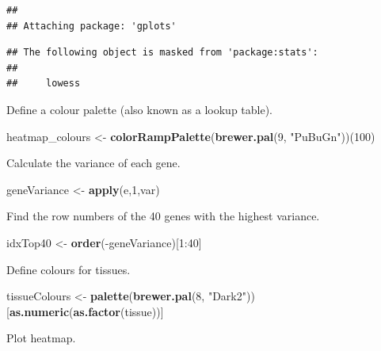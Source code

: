 \documentclass[]{book}
\newenvironment{Shaded}{\begin{snugshade}}{\end{snugshade}}
\newcommand{\KeywordTok}[1]{\textcolor[rgb]{0.13,0.29,0.53}{\textbf{{#1}}}}
\newcommand{\DecValTok}[1]{\textcolor[rgb]{0.00,0.00,0.81}{{#1}}}
\newcommand{\StringTok}[1]{\textcolor[rgb]{0.31,0.60,0.02}{{#1}}}
\newcommand{\NormalTok}[1]{{#1}}
\theoremstyle{definition}
\theoremstyle{definition}
\theoremstyle{definition}
\theoremstyle{remark}
\begin{document}
\begin{verbatim}
## 
## Attaching package: 'gplots'
\end{verbatim}

\begin{verbatim}
## The following object is masked from 'package:stats':
## 
##     lowess
\end{verbatim}

Define a colour palette (also known as a lookup table).

\begin{Shaded}
\begin{Highlighting}[]
\NormalTok{heatmap_colours <-}\StringTok{ }\KeywordTok{colorRampPalette}\NormalTok{(}\KeywordTok{brewer.pal}\NormalTok{(}\DecValTok{9}\NormalTok{, }\StringTok{"PuBuGn"}\NormalTok{))(}\DecValTok{100}\NormalTok{)}
\end{Highlighting}
\end{Shaded}

Calculate the variance of each gene.

\begin{Shaded}
\begin{Highlighting}[]
\NormalTok{geneVariance <-}\StringTok{ }\KeywordTok{apply}\NormalTok{(e,}\DecValTok{1}\NormalTok{,var)}
\end{Highlighting}
\end{Shaded}

Find the row numbers of the 40 genes with the highest variance.

\begin{Shaded}
\begin{Highlighting}[]
\NormalTok{idxTop40 <-}\StringTok{ }\KeywordTok{order}\NormalTok{(-geneVariance)[}\DecValTok{1}\NormalTok{:}\DecValTok{40}\NormalTok{]}
\end{Highlighting}
\end{Shaded}

Define colours for tissues.

\begin{Shaded}
\begin{Highlighting}[]
\NormalTok{tissueColours <-}\StringTok{ }\KeywordTok{palette}\NormalTok{(}\KeywordTok{brewer.pal}\NormalTok{(}\DecValTok{8}\NormalTok{, }\StringTok{"Dark2"}\NormalTok{))[}\KeywordTok{as.numeric}\NormalTok{(}\KeywordTok{as.factor}\NormalTok{(tissue))]}
\end{Highlighting}
\end{Shaded}

Plot heatmap.
\end{document}

